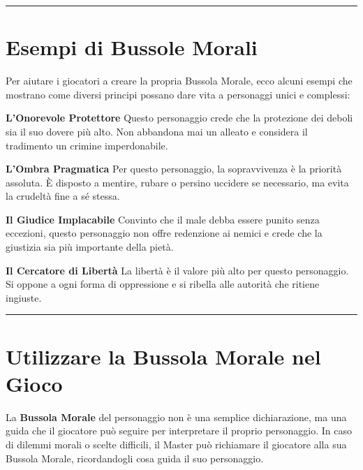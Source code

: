 \documentclass[../manuale_main.tex]{subfiles}
\begin{document}
\vspace{0.5cm}
\noindent
\begin{center}
\rule{\textwidth}{0.4pt} 
\end{center}
\vspace{0.5cm}

\section*{Esempi di Bussole Morali}
Per aiutare i giocatori a creare la propria Bussola Morale, ecco alcuni esempi che mostrano come diversi principi possano dare vita a personaggi unici e complessi:

\vspace{0.3cm}

\textbf{L'Onorevole Protettore}  
Questo personaggio crede che la protezione dei deboli sia il suo dovere più alto. Non abbandona mai un alleato e considera il tradimento un crimine imperdonabile.  

\vspace{0.2cm}

\textbf{L'Ombra Pragmatica}  
Per questo personaggio, la sopravvivenza è la priorità assoluta. È disposto a mentire, rubare o persino uccidere se necessario, ma evita la crudeltà fine a sé stessa.  

\vspace{0.2cm}

\textbf{Il Giudice Implacabile}  
Convinto che il male debba essere punito senza eccezioni, questo personaggio non offre redenzione ai nemici e crede che la giustizia sia più importante della pietà.  

\vspace{0.2cm}

\textbf{Il Cercatore di Libertà}  
La libertà è il valore più alto per questo personaggio. Si oppone a ogni forma di oppressione e si ribella alle autorità che ritiene ingiuste.  

\vspace{0.5cm}
\noindent
\begin{center}
\rule{\textwidth}{0.4pt} 
\end{center}
\vspace{0.5cm}

\section{Utilizzare la Bussola Morale nel Gioco}
La \textbf{Bussola Morale} del personaggio non è una semplice dichiarazione, ma una guida che il giocatore può seguire per interpretare il proprio personaggio. In caso di dilemmi morali o scelte difficili, il Master può richiamare il giocatore alla sua Bussola Morale, ricordandogli cosa guida il suo personaggio.
\end{document}
